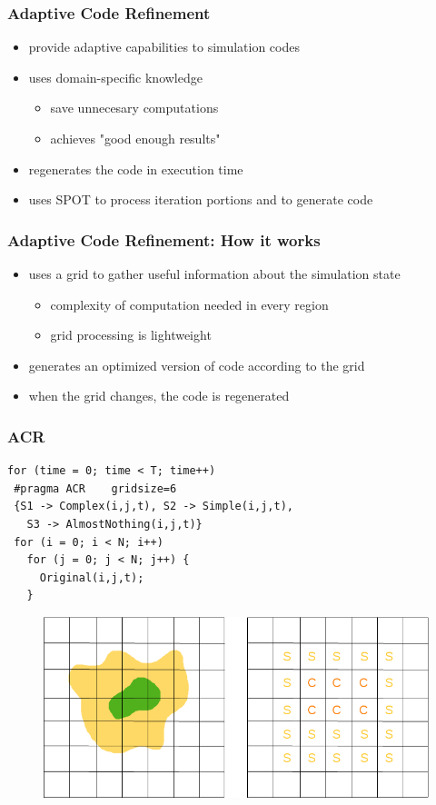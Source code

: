 \documentclass{beamer}\usetheme{Madrid} %
\begin{document}
\begin{frame}
\frametitle { Adaptive Code Refinement } 
\begin{itemize}
		\item 
			provide adaptive capabilities to simulation codes
		\item
			uses domain-specific knowledge
			\begin{itemize}
			\item 
				save unnecesary computations
			\item	
				achieves "good enough results"
			\end{itemize}
		\item 
			regenerates the code in execution time
		\item 
			uses SPOT to process iteration portions and to generate code
\end{itemize}
\end{frame}
\begin{frame}
\frametitle { Adaptive Code Refinement: How it works } 
\begin{itemize}
		\item 
			uses a grid to gather useful information about the simulation 
			state
		\begin{itemize}
			\item 
				complexity of computation needed in every region
			\item 
				grid processing is lightweight
			\end{itemize}
		\item 
			generates an optimized version of code according to the grid
		\item 
			when the grid changes, the code is regenerated
\end{itemize}
\end{frame}
\begin{frame}[fragile]
\frametitle { ACR }  
\begin{verbatim}
for (time = 0; time < T; time++) 
 #pragma ACR	gridsize=6 
 {S1 -> Complex(i,j,t), S2 -> Simple(i,j,t), 
   S3 -> AlmostNothing(i,j,t)}
 for (i = 0; i < N; i++) 
   for (j = 0; j < N; j++) { 
     Original(i,j,t);
   }
\end{verbatim}
\begin{figure}
        \includegraphics[scale=0.25]{img/grid-w.png}
\end{figure}
\end{frame}
\end{document}
